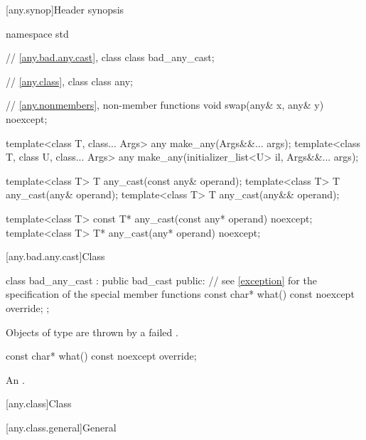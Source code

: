 [any.synop]{Header  synopsis}

%

\begin{codeblock}
namespace std {
  // \ref{any.bad.any.cast}, class 
  class bad_any_cast;

  // \ref{any.class}, class 
  class any;

  // \ref{any.nonmembers}, non-member functions
  void swap(any& x, any& y) noexcept;

  template<class T, class... Args>
    any make_any(Args&&... args);
  template<class T, class U, class... Args>
    any make_any(initializer_list<U> il, Args&&... args);

  template<class T>
    T any_cast(const any& operand);
  template<class T>
    T any_cast(any& operand);
  template<class T>
    T any_cast(any&& operand);

  template<class T>
    const T* any_cast(const any* operand) noexcept;
  template<class T>
    T* any_cast(any* operand) noexcept;
}
\end{codeblock}

[any.bad.any.cast]{Class }

%
\begin{codeblock}
class bad_any_cast : public bad_cast {
public:
  // see \ref{exception} for the specification of the special member functions
  const char* what() const noexcept override;
};
\end{codeblock}

\pnum
Objects of type  are thrown by a failed
.

%
\begin{itemdecl}
const char* what() const noexcept override;
\end{itemdecl}

\begin{itemdescr}
\pnum
\returns
An  \ntbs{}.
\end{itemdescr}

[any.class]{Class }

[any.class.general]{General}

